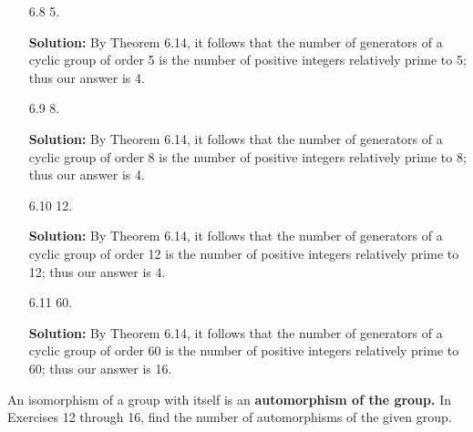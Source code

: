 \begin{enumerate}
   \item[6.8]  5.
   
      \textbf{Solution:} By Theorem 6.14, it follows that the number of
      generators of a cyclic group of order 5 is the number of positive integers
      relatively prime to 5; thus our answer is 4.
   \item[6.9]  8.
   
      \textbf{Solution:} By Theorem 6.14, it follows that the number of
      generators of a cyclic group of order 8 is the number of positive integers
      relatively prime to 8; thus our answer is 4.
   \item[6.10] 12.
   
      \textbf{Solution:} By Theorem 6.14, it follows that the number of
      generators of a cyclic group of order 12 is the number of positive
      integers relatively prime to 12; thus our answer is 4.
   \item[6.11] 60.
   
      \textbf{Solution:} By Theorem 6.14, it follows that the number of
      generators of a cyclic group of order 60 is the number of positive
      integers relatively prime to 60; thus our answer is 16.
\end{enumerate}

\noindent      An isomorphism of a group with itself is an
               \textbf{automorphism of the group.} In Exercises 12 through 16,
               find the number of automorphisms of the given group.

